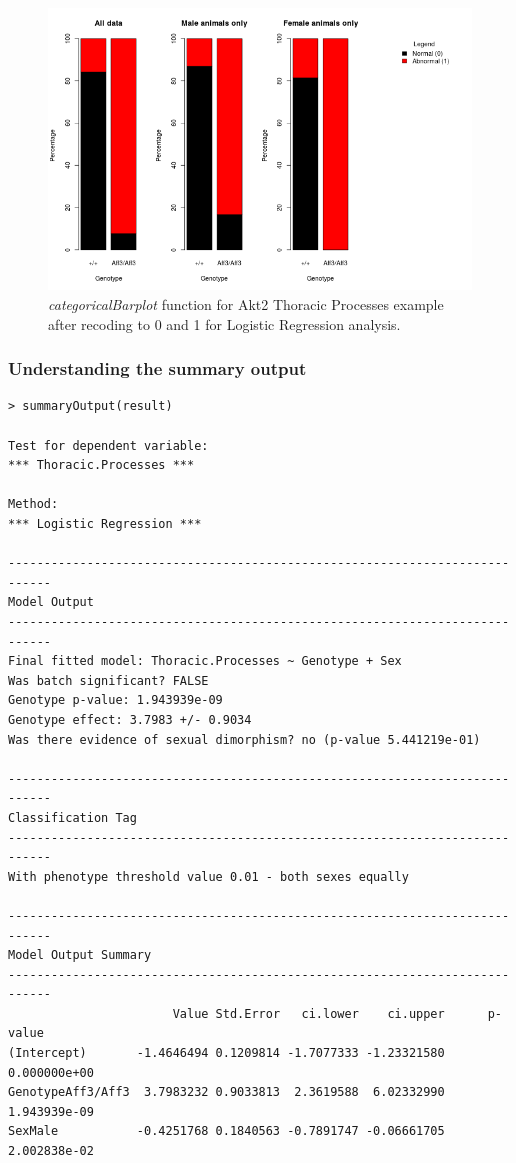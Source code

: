 \documentclass[12pt,a4paper]{article}
\begin{document}
\begin{figure}[H]%
\centerline{\includegraphics[scale=0.5]{LR_example.png}}
\caption{\textit{categoricalBarplot} function for Akt2 Thoracic Processes example after recoding to 0 and 1 for Logistic Regression analysis.}\label{fig:26}
\end{figure}

\subsubsection{Understanding the summary output}
\begingroup
\fontsize{8pt}{12pt}\selectfont
\begin{verbatim}
> summaryOutput(result)

Test for dependent variable:
*** Thoracic.Processes ***

Method:
*** Logistic Regression ***

----------------------------------------------------------------------------
Model Output
----------------------------------------------------------------------------
Final fitted model: Thoracic.Processes ~ Genotype + Sex
Was batch significant? FALSE
Genotype p-value: 1.943939e-09
Genotype effect: 3.7983 +/- 0.9034
Was there evidence of sexual dimorphism? no (p-value 5.441219e-01)

----------------------------------------------------------------------------
Classification Tag
----------------------------------------------------------------------------
With phenotype threshold value 0.01 - both sexes equally

----------------------------------------------------------------------------
Model Output Summary
----------------------------------------------------------------------------
                       Value Std.Error   ci.lower    ci.upper      p-value
(Intercept)       -1.4646494 0.1209814 -1.7077333 -1.23321580 0.000000e+00
GenotypeAff3/Aff3  3.7983232 0.9033813  2.3619588  6.02332990 1.943939e-09
SexMale           -0.4251768 0.1840563 -0.7891747 -0.06661705 2.002838e-02
\end{verbatim}
\endgroup
\end{document}
